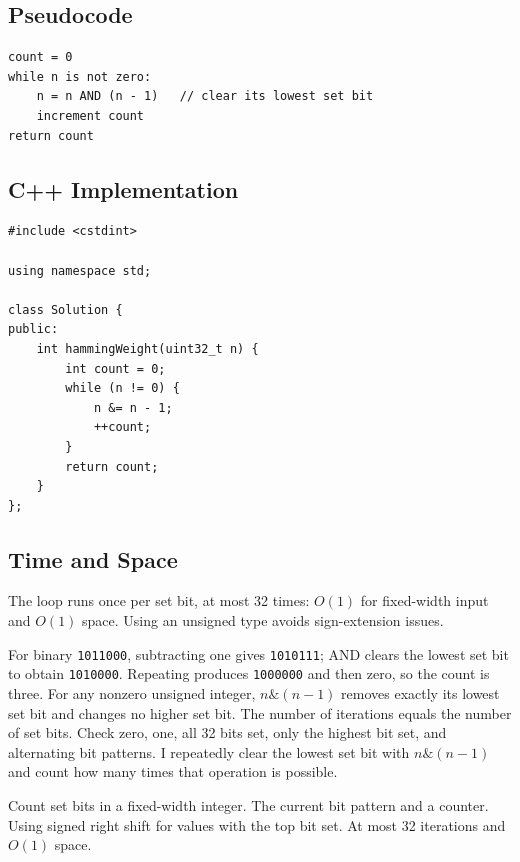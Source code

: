 \subsection{Pseudocode}
\begin{lstlisting}[style=pseudocode]
count = 0
while n is not zero:
    n = n AND (n - 1)   // clear its lowest set bit
    increment count
return count
\end{lstlisting}

\subsection{C++ Implementation}
\begin{lstlisting}[style=compactcode,caption={Complete C++ solution: Number of 1 Bits}]
#include <cstdint>

using namespace std;

class Solution {
public:
    int hammingWeight(uint32_t n) {
        int count = 0;
        while (n != 0) {
            n &= n - 1;
            ++count;
        }
        return count;
    }
};
\end{lstlisting}

\subsection{Time and Space}
The loop runs once per set bit, at most 32 times: \(O(1)\) for fixed-width
input and \(O(1)\) space. Using an unsigned type avoids sign-extension issues.

\lessonexpansion
  {For binary \texttt{1011000}, subtracting one gives \texttt{1010111}; AND
   clears the lowest set bit to obtain \texttt{1010000}. Repeating produces
   \texttt{1000000} and then zero, so the count is three.}
  {For any nonzero unsigned integer, \(n\mathbin{\&}(n-1)\) removes exactly
   its lowest set bit and changes no higher set bit. The number of iterations
   equals the number of set bits.}
  {Check zero, one, all 32 bits set, only the highest bit set, and alternating
   bit patterns.}
  {I repeatedly clear the lowest set bit with \(n\mathbin{\&}(n-1)\) and count
   how many times that operation is possible.}

\chaptercheckpoint
  {Count set bits in a fixed-width integer.}
  {The current bit pattern and a counter.}
  {Using signed right shift for values with the top bit set.}
  {At most 32 iterations and $O(1)$ space.}
